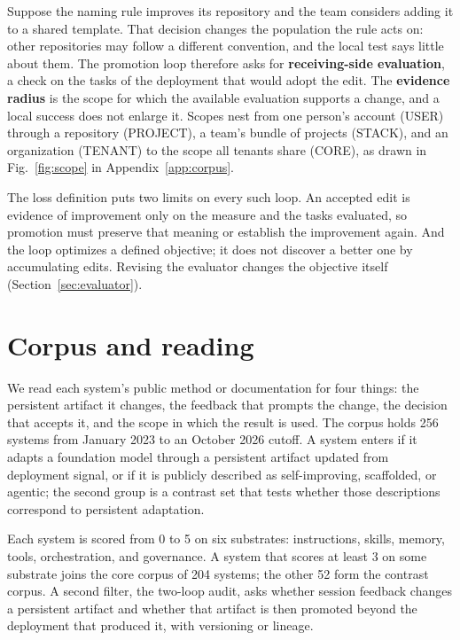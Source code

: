 Suppose the naming rule improves its repository and the team considers adding it to a shared template. That decision changes the population the rule acts on: other repositories may follow a different convention, and the local test says little about them. The promotion loop therefore asks for \textbf{receiving-side evaluation}, a check on the tasks of the deployment that would adopt the edit. The \textbf{evidence radius} is the scope for which the available evaluation supports a change, and a local success does not enlarge it. Scopes nest from one person's account (USER) through a repository (PROJECT), a team's bundle of projects (STACK), and an organization (TENANT) to the scope all tenants share (CORE), as drawn in Fig.~\ref{fig:scope} in Appendix~\ref{app:corpus}.

The loss definition puts two limits on every such loop. An accepted edit is evidence of improvement only on the measure and the tasks evaluated, so promotion must preserve that meaning or establish the improvement again. And the loop optimizes a defined objective; it does not discover a better one by accumulating edits. Revising the evaluator changes the objective itself (Section~\ref{sec:evaluator}).

\section{Corpus and reading}\label{sec:method}

We read each system's public method or documentation for four things: the persistent artifact it changes, the feedback that prompts the change, the decision that accepts it, and the scope in which the result is used. The corpus holds 256 systems from January 2023 to an October 2026 cutoff. A system enters if it adapts a foundation model through a persistent artifact updated from deployment signal, or if it is publicly described as self-improving, scaffolded, or agentic; the second group is a contrast set that tests whether those descriptions correspond to persistent adaptation.

Each system is scored from 0 to 5 on six substrates: instructions, skills, memory, tools, orchestration, and governance. A system that scores at least 3 on some substrate joins the core corpus of 204 systems; the other 52 form the contrast corpus. A second filter, the two-loop audit, asks whether session feedback changes a persistent artifact and whether that artifact is then promoted beyond the deployment that produced it, with versioning or lineage.

